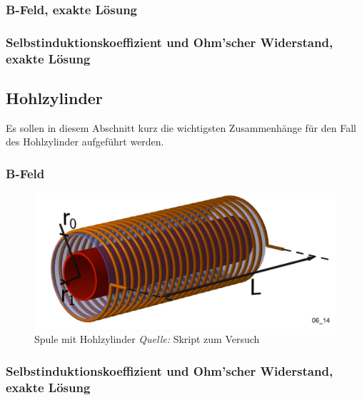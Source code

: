 \subsubsection{B-Feld, exakte L\"osung}
\label{sec:arbgru:subsec:vollzylinder:bFeldexakt}


\subsubsection{Selbstinduktionskoeffizient und Ohm'scher Widerstand, exakte L\"osung}
\label{sec:arbgru:subsec:vollzylinder:LRexakt}


\subsection{Hohlzylinder}
\label{sec:arbgru:subsec:hohlzyliner}

Es sollen in  diesem Abschnitt kurz die wichtigsten  Zusammenh\"ange f\"ur den
Fall des Hohlzylinder aufgef\"uhrt werden.

\subsubsection{B-Feld}
\label{sec:arbgru:subsec:vollzylinder:herleitDGL}


\begin{figure}[th!]
    \centering
    \includegraphics[width=.5\textwidth]{images/spule-hohlzylinder.png}
    \caption{Spule mit Hohlzylinder \emph{Quelle:} Skript zum Versuch}
\end{figure}



\subsubsection{Selbstinduktionskoeffizient und Ohm'scher Widerstand, exakte L\"osung}
\label{sec:arbgru:subsec:vollzylinder:LRexakt}
